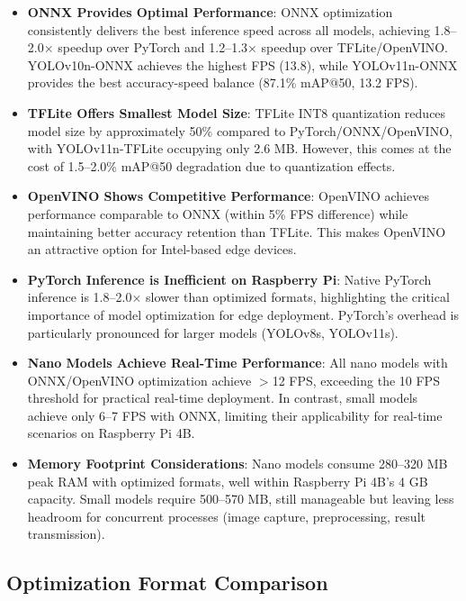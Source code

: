 \begin{itemize}
\item \textbf{ONNX Provides Optimal Performance}: ONNX optimization consistently delivers the best inference speed across all models, achieving 1.8--2.0$\times$ speedup over PyTorch and 1.2--1.3$\times$ speedup over TFLite/OpenVINO. YOLOv10n-ONNX achieves the highest FPS (13.8), while YOLOv11n-ONNX provides the best accuracy-speed balance (87.1\% mAP@50, 13.2 FPS).

\item \textbf{TFLite Offers Smallest Model Size}: TFLite INT8 quantization reduces model size by approximately 50\% compared to PyTorch/ONNX/OpenVINO, with YOLOv11n-TFLite occupying only 2.6 MB. However, this comes at the cost of 1.5--2.0\% mAP@50 degradation due to quantization effects.

\item \textbf{OpenVINO Shows Competitive Performance}: OpenVINO achieves performance comparable to ONNX (within 5\% FPS difference) while maintaining better accuracy retention than TFLite. This makes OpenVINO an attractive option for Intel-based edge devices.

\item \textbf{PyTorch Inference is Inefficient on Raspberry Pi}: Native PyTorch inference is 1.8--2.0$\times$ slower than optimized formats, highlighting the critical importance of model optimization for edge deployment. PyTorch's overhead is particularly pronounced for larger models (YOLOv8s, YOLOv11s).

\item \textbf{Nano Models Achieve Real-Time Performance}: All nano models with ONNX/OpenVINO optimization achieve $>$12 FPS, exceeding the 10 FPS threshold for practical real-time deployment. In contrast, small models achieve only 6--7 FPS with ONNX, limiting their applicability for real-time scenarios on Raspberry Pi 4B.

\item \textbf{Memory Footprint Considerations}: Nano models consume 280--320 MB peak RAM with optimized formats, well within Raspberry Pi 4B's 4 GB capacity. Small models require 500--570 MB, still manageable but leaving less headroom for concurrent processes (image capture, preprocessing, result transmission).
\end{itemize}

\subsection{Optimization Format Comparison}

